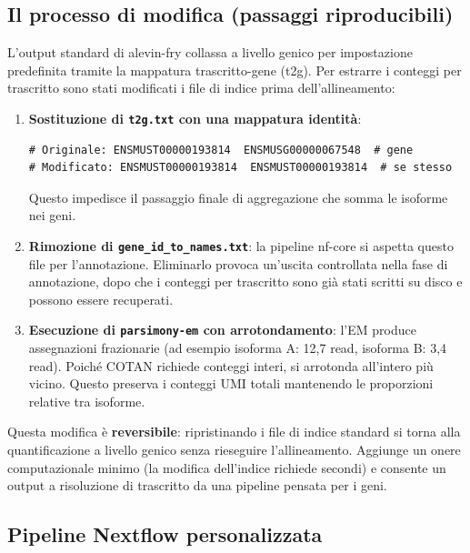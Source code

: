 \subsection*{Il processo di modifica (passaggi riproducibili)}\label{sec:modification-process}

L'output standard di alevin-fry collassa a livello genico per impostazione predefinita tramite la mappatura trascritto-gene (t2g). Per estrarre i conteggi per trascritto sono stati modificati i file di indice prima dell'allineamento:

\begin{enumerate}
    \item \textbf{Sostituzione di \texttt{t2g.txt} con una mappatura identità}:
{\small\begin{verbatim}
# Originale: ENSMUST00000193814  ENSMUSG00000067548  # gene
# Modificato: ENSMUST00000193814  ENSMUST00000193814  # se stesso
\end{verbatim}}
    Questo impedisce il passaggio finale di aggregazione che somma le isoforme nei geni.
    
    \item \textbf{Rimozione di \texttt{gene\_id\_to\_names.txt}}: la pipeline nf-core si aspetta questo file per l'annotazione. Eliminarlo provoca un'uscita controllata nella fase di annotazione, dopo che i conteggi per trascritto sono già stati scritti su disco e possono essere recuperati.
    
    \item \textbf{Esecuzione di \texttt{parsimony-em} con arrotondamento}: l'EM produce assegnazioni frazionarie (ad esempio isoforma A: 12,7 read, isoforma B: 3,4 read). Poiché COTAN richiede conteggi interi, si arrotonda all'intero più vicino. Questo preserva i conteggi UMI totali mantenendo le proporzioni relative tra isoforme.
\end{enumerate}

Questa modifica è \textbf{reversibile}: ripristinando i file di indice standard si torna alla quantificazione a livello genico senza rieseguire l'allineamento. Aggiunge un onere computazionale minimo (la modifica dell'indice richiede secondi) e consente un output a risoluzione di trascritto da una pipeline pensata per i geni.

\subsection*{Pipeline Nextflow personalizzata}

